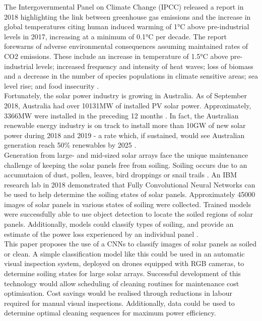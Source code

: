 \documentclass[10pt,journal,compsoc]{IEEEtran}
\begin{document}
		The Intergovernmental Panel on Climate Change (IPCC) released a report in 2018 highlighting the link between greenhouse gas emissions and the increase in global temperatures citing human induced warming of 1$\si{\celsius}$ above pre-industrial levels in 2017, increasing at a minimum of 0.1$ \si{\celsius}$ per decade. The report forewarns of adverse environmental consequences assuming maintained rates of CO2 emissions. These include an increase in temperature of 1.5$ \si{\celsius}$ above pre-industrial levels; increased frequency and intensity of heat waves; loss of biomass and a decrease in the number of species populations in climate sensitive areas; sea level rise; and food insecurity \cite{IPCC:2018}.\\ 
		
		Fortunately, the solar power industry is growing in Australia. As of September 2018, Australia had over 10131$\si{\mega\watt}$ of installed PV solar power. Approximately, 3366$\si{\mega\watt}$ were installed in the preceding 12 months \cite{APVI:2018}. In fact, the Australian renewable energy industry is on track to install more than 10$\si{\giga\watt}$ of new solar power during 2018 and 2019 - a rate which, if sustained, would see Australian generation reach 50\% renewables by 2025 \cite{Baldwin:2018}.\\
		
		Generation from large- and mid-sized solar arrays face the unique maintenance challenge of keeping the solar panels free from soiling. Soiling occurs due to an accumutaion of dust, pollen, leaves, bird droppings or snail trails \cite{Maghami:2016}. An IBM research lab in 2018 demonstrated that Fully Convolutional Neural Networks can be used to help determine the soiling states of solar panels. Approximately 45000 images of solar panels in various states of soiling were collected. Trained models were successfully able to use object detection to locate the soiled regions of solar panels. Additionally, models could classify types of soiling, and provide an estimate of the power loss experienced by an individual panel \cite{Mehta:2018}.\\
		
		This paper proposes the use of a CNNs to classify images of solar panels as soiled or clean. A simple classification model like this could be used in an automatic visual inspection system, deployed on drones equipped with RGB cameras, to determine soiling states for large solar arrays. Successful development of this technology would allow scheduling of cleaning routines for maintenance cost optimisation. Cost savings would be realised through reductions in labour required for manual visual inspections. Additionally, data could be used to determine optimal cleaning sequences for maximum power efficiency.\\
		
\end{document}

